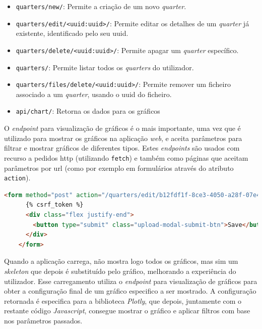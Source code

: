 \begin{itemize}
    \item \texttt{quarters/new/}: Permite a criação de um novo \textit{quarter}.
    \item \texttt{quarters/edit/<uuid:uuid>/}: Permite editar os detalhes de um \textit{quarter} já existente, identificado pelo seu \gls{uuid}.
    \item \texttt{quarters/delete/<uuid:uuid>/}: Permite apagar um \textit{quarter} específico.
    \item \texttt{quarters/}: Permite listar todos os \textit{quarters} do utilizador.
    \item \texttt{quarters/files/delete/<uuid:uuid>/}: Permite remover um ficheiro associado a um \textit{quarter}, usando o \gls{uuid} do ficheiro.
    \item \texttt{api/chart/}: Retorna os dados para os gráficos
  \end{itemize}
  
O \textit{endpoint} para visualização de gráficos é o mais importante, uma vez que é utilizado para mostrar os gráficos na aplicação \textit{web}, e aceita parâmetros para filtrar e mostrar gráficos de diferentes tipos. Estes \textit{endpoints} são usados com recurso a pedidos \gls{http} (utilizando \texttt{fetch}) e também como páginas que aceitam parâmetros por \gls{url} (como por exemplo em formulários através do atributo \texttt{action}).


\begin{lstlisting}[language=HTML, caption={Excerto do código \gls{html} do formulário de edição de \textit{quarter} }]
    <form method="post" action="/quarters/edit/b12fdf1f-8ce3-4050-a28f-07e444e15042/" id="edit-quarter-form" class="upload-form-wrapper" enctype="multipart/form-data">
      {% csrf_token %}
      <div class="flex justify-end">
        <button type="submit" class="upload-modal-submit-btn">Save</button>
      </div>
    </form>
    \end{lstlisting}

Quando a aplicação carrega, não mostra logo todos os gráficos, mas sim um \textit{skeleton} que depois é substituído pelo gráfico, melhorando a experiência do utilizador. Esse carregamento utiliza o \textit{endpoint} para visualização de gráficos para obter a configuração final de um gráfico especifico a ser mostrado. A configuração retornada é especifica para a biblioteca \textit{Plotly}, que depois, juntamente com o restante código \textit{Javascript}, consegue mostrar o gráfico e aplicar filtros com base nos parâmetros passados.

